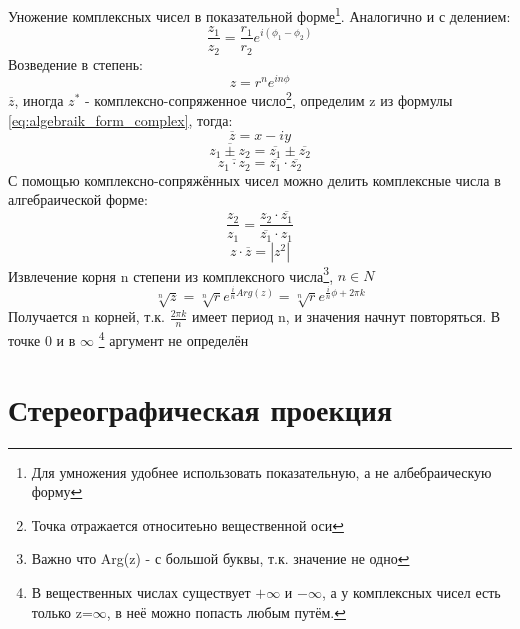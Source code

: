 \documentclass{article}
\begin{document}
            Уножение комплексных чисел в показательной форме\footnote{Для умножения удобнее использовать показательную, а не албебраическую форму}. Аналогично и с делением:
            \begin{equation}
               \frac{z_{1}}{z_{2}}=\frac{r_{1}}{r_{2}} e^{i (\phi_{1} - \phi_{2})}              
            \end{equation}
          Возведение в степень:
            \begin{equation}
               z=r^{n} e^{i n \phi}              
            \end{equation}
            $ \overline{z} $, иногда $z^{*}$ - комплексно-сопряженное число\footnote{Точка отражается относитеьно вещественной оси}, определим z из формулы \ref{eq:algebraik_form_complex}, тогда:
            \begin{equation}\label{complex_conjugate}
               \overline{z}=x-i y              
            \end{equation}
            \begin{equation}\label{complex_conjugate}
               \overline{z_{1} \pm z_{2}}=\overline{z_{1}} \pm \overline{z_{2}}              
            \end{equation}
            \begin{equation}\label{complex_conjugate}
               \overline{z_{1} \cdot z_{2}}=\overline{z_{1}} \cdot \overline{z_{2}}              
            \end{equation}
            С помощью комплексно-сопряжённых чисел можно делить комплексные числа в алгебраической форме:
            \begin{equation}
               \frac{ z_{2} }{ z_{1} } = \frac{ z_{2} \cdot \overline{ z_{1} }}{ \overline{z_{1}} \cdot z_{1} }
            \end{equation}
            \begin{equation}
               z \cdot \overline{z}=|z^{2}|
            \end{equation}
          Извлечение корня n степени из комплексного числа\footnote{Важно что Arg(z) - с большой буквы, т.к. значение не одно}, $n \in N $
            \begin{equation}
              \sqrt[n]{z}=\sqrt[n]{r} e^{\frac{i}{n} Arg(z)}=\sqrt[n]{r} e^{\frac{i}{n} \phi + 2 \pi k}
            \end{equation}
          Получается n корней, т.к. $\frac{2 \pi k}{n}$ имеет период n, и значения начнут повторяться. В точке 0 и в $\infty$ \footnote{
              В вещественных числах существует $+ \infty$ и $- \infty$, а у комплексных чисел есть только z=$\infty$, в неё можно попасть любым путём.
            } аргумент не определён
            \newpage
        \section{Стереографическая проекция}
\end{document}
